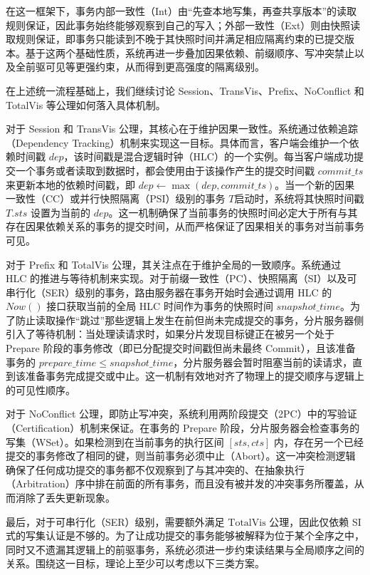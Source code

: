 在这一框架下，事务内部一致性（Int）由“先查本地写集，再查共享版本”的读取规则保证，因此事务始终能够观察到自己的写入；外部一致性（Ext）则由快照读取规则保证，即事务只能读到不晚于其快照时间并满足相应隔离约束的已提交版本。基于这两个基础性质，系统再进一步叠加因果依赖、前缀顺序、写冲突禁止以及全前驱可见等更强约束，从而得到更高强度的隔离级别。

在上述统一流程基础上，我们继续讨论 Session、TransVis、Prefix、NoConflict 和 TotalVis 等公理如何落入具体机制。

对于 Session 和 TransVis 公理，其核心在于维护因果一致性。系统通过依赖追踪（Dependency Tracking）机制来实现这一目标。具体而言，客户端会维护一个依赖时间戳 $dep$，该时间戳是混合逻辑时钟（HLC）的一个实例。每当客户端成功提交一个事务或者读取到数据时，都会使用由于该操作产生的提交时间戳 $commit\_ts$ 来更新本地的依赖时间戳，即 $dep \leftarrow \max(dep, commit\_ts)$。当一个新的因果一致性（CC）或并行快照隔离（PSI）级别的事务 $T$启动时，系统将其快照时间戳 $T.sts$ 设置为当前的 $dep$。这一机制确保了当前事务的快照时间必定大于所有与其存在因果依赖关系的事务的提交时间，从而严格保证了因果相关的事务对当前事务可见。

对于 Prefix 和 TotalVis 公理，其关注点在于维护全局的一致顺序。系统通过 HLC 的推进与等待机制来实现。对于前缀一致性（PC）、快照隔离（SI）以及可串行化（SER）级别的事务，路由服务器在事务开始时会通过调用 HLC 的 $Now()$ 接口获取当前的全局 HLC 时间作为事务的快照时间 $snapshot\_time$。为了防止读取操作“跳过”那些逻辑上发生在前但尚未完成提交的事务，分片服务器侧引入了等待机制：当处理读请求时，如果分片发现目标键正在被另一个处于 Prepare 阶段的事务修改（即已分配提交时间戳但尚未最终 Commit），且该准备事务的 $prepare\_time \le snapshot\_time$，分片服务器会暂时阻塞当前的读请求，直到该准备事务完成提交或中止。这一机制有效地对齐了物理上的提交顺序与逻辑上的可见性顺序。

对于 NoConflict 公理，即防止写冲突，系统利用两阶段提交（2PC）中的写验证（Certification）机制来保证。在事务的 Prepare 阶段，分片服务器会检查事务的写集（WSet）。如果检测到在当前事务的执行区间 $[sts, cts]$ 内，存在另一个已经提交的事务修改了相同的键，则当前事务必须中止（Abort）。这一冲突检测逻辑确保了任何成功提交的事务都不仅观察到了与其冲突的、在抽象执行（Arbitration）序中排在前面的所有事务，而且没有被并发的冲突事务所覆盖，从而消除了丢失更新现象。

最后，对于可串行化（SER）级别，需要额外满足 $\text{TotalVis}$ 公理，因此仅依赖 SI 式的写集认证是不够的。为了让成功提交的事务能够被解释为位于某个全序之中，同时又不遗漏其逻辑上的前驱事务，系统必须进一步约束读结果与全局顺序之间的关系。围绕这一目标，理论上至少可以考虑以下三类方案。

